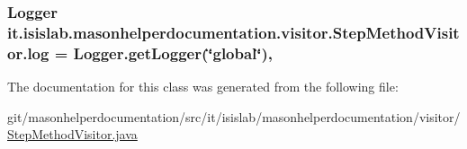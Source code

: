 \hypertarget{classit_1_1isislab_1_1masonhelperdocumentation_1_1visitor_1_1_step_method_visitor_a6ac36412801015cd6a1c3a8b19d55b63}{
\subsubsection[{log}]{\setlength{\rightskip}{0pt plus 5cm}Logger it.\-isislab.\-masonhelperdocumentation.\-visitor.\-Step\-Method\-Visitor.\-log = Logger.\-get\-Logger(\char`\"{}global\char`\"{})\hspace{0.3cm}{\ttfamily [static]}, {\ttfamily [private]}}}\label{classit_1_1isislab_1_1masonhelperdocumentation_1_1visitor_1_1_step_method_visitor_a6ac36412801015cd6a1c3a8b19d55b63}


The documentation for this class was generated from the following file\-:\begin{DoxyCompactItemize}
\item 
git/masonhelperdocumentation/src/it/isislab/masonhelperdocumentation/visitor/\hyperlink{_step_method_visitor_8java}{Step\-Method\-Visitor.\-java}\end{DoxyCompactItemize}
